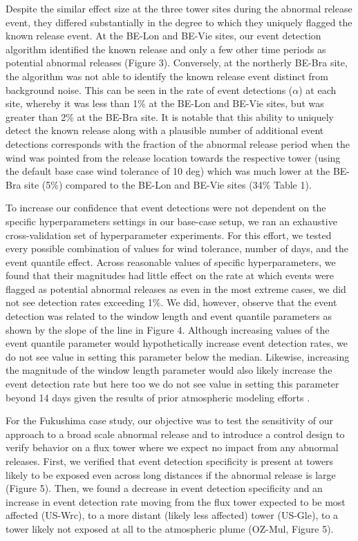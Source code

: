 \documentclass{article}
\begin{document}
Despite the similar effect size at the three tower sites during the abnormal release event, they differed substantially in the degree to which they uniquely flagged the known release event. At the BE-Lon and BE-Vie sites, our event detection algorithm identified the known release and only a few other time periods as potential abnormal releases (Figure 3). Conversely, at the northerly BE-Bra site, the algorithm was not able to identify the known release event distinct from background noise. This can be seen in the rate of event detections ($\alpha$) at each site, whereby it was less than 1\% at the BE-Lon and BE-Vie sites, but was greater than 2\% at the BE-Bra site. It is notable that this ability to uniquely detect the known release along with a plausible number of additional event detections corresponds with the fraction of the abnormal release period when the wind was pointed from the release location towards the respective tower (using the default base case wind tolerance of 10 deg) which was much lower at the BE-Bra site (5\%) compared to the BE-Lon and BE-Vie sites (34\% Table 1). 

To increase our confidence that event detections were not dependent on the specific hyperparameters settings in our base-case setup, we ran an exhaustive cross-validation set of hyperparameter experiments. For this effort, we tested every possible combination of values for wind tolerance, number of days, and the event quantile effect. Across reasonable values of specific hyperparameters, we found that their magnitudes had little effect on the rate at which events were flagged as potential abnormal releases as even in the most extreme cases, we did not see detection rates exceeding 1\%. We did, however, observe that the event detection was related to the window length and event quantile parameters as shown by the slope of the line in Figure 4. Although increasing values of the event quantile parameter would hypothetically increase event detection rates, we do not see value in setting this parameter below the median. Likewise, increasing the magnitude of the window length parameter would also likely increase the event detection rate but here too we do not see value in setting this parameter beyond 14 days given the results of prior atmospheric modeling efforts \citep[e.g.][]{meszarosPredictabilityDispersionFukushimaderived2016}.

For the Fukushima case study, our objective was to test the sensitivity of our approach to a broad scale abnormal release and to introduce a control design to verify behavior on a flux tower where we expect no impact from any abnormal releases. First, we verified that event detection specificity is present at towers likely to be exposed even across long distances if the abnormal release is large (Figure 5). Then, we found a decrease in event detection specificity and an increase in event detection rate moving from the flux tower expected to be most affected (US-Wrc), to a more distant (likely less affected) tower (US-Gle), to a tower likely not exposed at all to the atmospheric plume (OZ-Mul, Figure 5).
\end{document}
